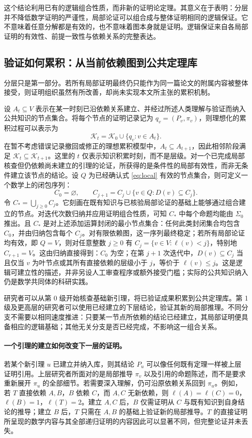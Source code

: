 \documentclass[UTF8,11pt,a4paper,fontset=fandol]{ctexart}
\theoremstyle{definition}\newtheorem{definition}{定义}
\newcommand{\K}{\mathcal K}
\begin{document}
这个结论利用已有的逻辑组合性质，而非新的证明论定理。其意义在于表明：分层并不降低数学证明的严谨性，局部论证可以组合成与整体证明相同的逻辑保证。它不意味着任意分解都是有效的，也不意味着图本身就是证明。逻辑保证来自各局部证明的有效性、前提一致性与依赖关系的完整表达。

\subsection{验证如何累积：从当前依赖图到公共定理库}
分层只是第一部分。若所有局部证明最终仍只能作为同一篇论文的附属内容被整体接受，则证明组织虽然有所改善，却尚未实现本文所主张的累积机制。

设 $A_t\subseteq V$ 表示在某一时刻已沿依赖关系建立、并经过所述人类理解与验证而纳入公共知识的节点集合。将每个节点的证明记录记为 $q_v=(P_v,\pi_v)$，则理想化的累积过程可以表示为
\begin{equation}\label{eq:lib}
 \K_t=\K_0\cup\{q_v:v\in A_t\}.
\end{equation}
在暂不考虑错误记录撤回或修正的理想累积模型中，$A_t\subseteq A_{t+1}$，因此相邻阶段满足 $\K_t\subseteq\K_{t+1}$。这里的 $t$ 仅表示知识积累时刻，而不是层级。对一个已完成局部核查但仍依赖尚未建立的引理的论证，所获得的是条件性的局部有效性，而非无条件建立该节点的结论。设 $Q$ 为已经确认式 \eqref{eq:local} 有效的节点集合，则可定义一个数学上的闭包序列：
\[
 C_0=\varnothing,\qquad
 C_{j+1}=C_j\cup\{v\in Q:D(v)\subseteq C_j\}.
\]
令 $C_*=\bigcup_{j\ge0}C_j$。它刻画在既有知识与已核验局部论证的基础上能够通过组合建立的节点。对迭代次数归纳并应用证明组合性质，可知 $C_*$ 中每个命题均能由 $\Sigma_0$ 推出。且 $C_*$ 是对上述添加运算封闭的最小节点集合：任何此类封闭集合均包含 $C_0$，并由归纳包含每个 $C_j$。对有限依赖图，这一序列最终稳定；若所有局部论证均有效，即 $Q=V$，则对任意整数 $j\ge0$ 有 $C_j=\{v\in V:\ell(v)<j\}$，特别地 $C_{r+1}=V$。这由归纳直接得到：$C_0$ 为空；在第 $j+1$ 次迭代中，$D(v)\subseteq C_j$ 当且仅当 $v$ 为叶节点或其所有直接依赖的层级小于 $j$，等价于 $\ell(v)\le j$。这是逻辑可建立性的描述，并非另设人工审查程序或额外接受门槛；实际的公共知识纳入仍是数学共同体的科研实践。

研究者可以从第 0 级开始核查基础新引理，将已验证成果积累到公共定理库。第 1 级及更高层的研究者可以使用已经建立的下层结论，验证其新的局部推理。不同分支不需要以相同速度推进：只要某一节点所依赖的结论已经建立，其局部证明便具备相应的逻辑基础；其他无关分支是否已经完成，不影响这一组合关系。

\paragraph{一个引理的建立如何改变下一层的证明。}
若某个新引理 $u$ 已建立并纳入库，则其结论 $P_u$ 可以像任何既有定理一样被上层证明引用。上层研究者所面对的是局部推导 $\pi_v$ 以及引用的命题陈述，而不是要求重新展开 $\pi_u$ 的全部细节。若需要深入理解，仍可沿原依赖关系回到 $\pi_u$。例如，若 $T$ 直接依赖 $A,B$，$B$ 依赖 $C$，而 $A,C$ 无新依赖，则 $\ell(A)=\ell(C)=0$，$\ell(B)=1$，$\ell(T)=2$。建立 $A,C$ 后，$B$ 仅需证明从 $C$ 与既有知识到自身结论的推导；建立 $B$ 后，$T$ 只需在 $A,B$ 的基础上验证新的局部推导。$T$ 的直接证明所呈现的数学内容与其全部递归证明的内容因此可以显著不同，但完整论证并未丢失。
\end{document}

